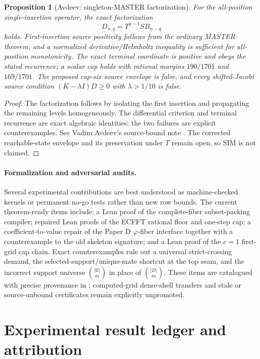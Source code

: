 \documentclass[11pt,a4paper]{amsart}
\numberwithin{equation}{section}
\newtheorem{proposition}[theorem]{Proposition}
\theoremstyle{remark}
\newcommand{\B}{\mathbb B}
\begin{document}
\begin{proposition}[Avdeev: singleton-MASTER factorization]\label{prop:singleton-master}
For the all-position single-insertion operator, the exact factorization
\[
 D_{n,q}=T^{q-1}SB_{n-q}
\]
holds.  First-insertion source positivity follows from the ordinary MASTER theorem, and a normalized derivative/Helmholtz inequality is sufficient for all-position monotonicity.  The exact terminal coordinate is positive and obeys the stated recurrence; a scalar cap holds with rational margins $190/1701$ and $169/1701$.  The proposed cap-six source envelope is false, and every shifted-Jacobi source condition $(K-\lambda I)D\ge0$ with $\lambda>1/10$ is false.
\end{proposition}

\begin{proof}
The factorization follows by isolating the first insertion and propagating the remaining levels homogeneously.  The differential criterion and terminal recurrence are exact algebraic identities; the two failures are explicit counterexamples.  See Vadim Avdeev's source-bound note \cite{AvdeevSIM26}.  The corrected reachable-state envelope and its preservation under $T$ remain open, so SIM is not claimed.
\end{proof}

\paragraph{Formalization and adversarial audits.}
Several experimental contributions are best understood as machine-checked kernels or permanent no-go tests rather than new row bounds.  The current theorem-ready items include: a Lean proof of the complete-fiber subset-packing compiler; repaired Lean proofs of the ECFFT rational floor and one-step cap; a coefficient-to-value repair of the Paper D $\varphi$-fiber interface together with a counterexample to the old skeleton signature; and a Lean proof of the $c=1$ first-grid cap chain.  Exact counterexamples rule out a universal strict-crossing demand, the selected-support/unique-mate shortcut at the top seam, and the incorrect support universe $\binom{|\B|}{m}$ in place of $\binom{|D|}{m}$.  These items are catalogued with precise provenance in \cite{PRReport26,RepoLog26}; computed-grid dense-shell transfers and stale or source-unbound certificates remain explicitly unpromoted.

\section{Experimental result ledger and attribution}
\label{sec:experimental-ledger}
\end{document}
